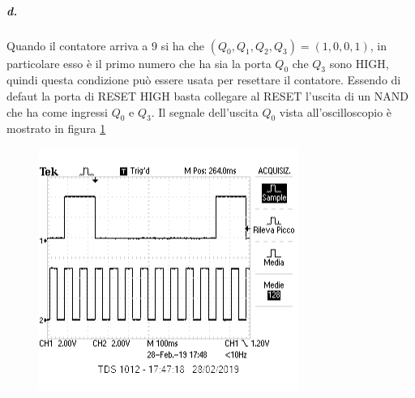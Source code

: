 \documentclass{article}
\begin{document}
	\subparagraph{d.} Quando il contatore arriva a 9 si ha che $(Q_0,Q_1,Q_2,Q_3)=(1,0,0,1)$, in particolare esso è il primo numero che ha sia la porta $Q_0$ che $Q_3$ sono HIGH, quindi questa condizione può essere usata per resettare il contatore. Essendo di defaut la porta di RESET HIGH basta collegare al RESET l'uscita di un NAND che ha come ingressi $Q_0$ e $Q_3$. Il segnale dell'uscita $Q_0$ vista all'oscilloscopio è mostrato in figura \ref{fig:3d}
		\begin{figure}
		\begin{center}
			\includegraphics[width=0.5\linewidth]{immagini/3d}
			\label{fig:3d}
		\end{center}
		\end{figure}
\end{document}
